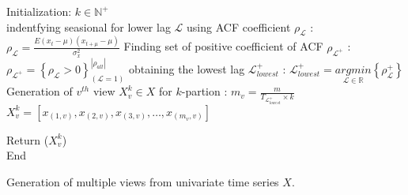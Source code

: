 \documentclass[a4paper, fleqn]{cas-sc}
\theoremstyle{definition}
\theoremstyle{remark}
\begin{document}
\newcommand\mycommfont[1]{\footnotesize\ttfamily\textcolor{blue}{#1}}

\begin{algorithm}[!ht]
  \DontPrintSemicolon
  
    
  Initialization:  $k \in \mathbb{N}^+$\\ 
  indentfying seasional for lower lag $\mathscr{L}$ using ACF coefficient $\rho_{\mathscr{L}}$ :  
  $\rho_{\mathscr{L}}=\frac{E (x_t-\mu) (x_{t+\mu} -\mu)}{\sigma_x^2}$ 
  Finding set of positive coefficient of ACF $\rho_{\mathscr{L}^+}$ :  
  $\rho_{\mathscr{L}^+}= \left\{\rho_{\mathscr{L}} > 0 \right\}_{(\mathscr{L}=1)}^{ \left| \rho_{all} \right|}$ 
  obtaining the lowest lag $\mathscr{L}_{lowest}^+$ :  
  $ \mathscr{L}_{lowest}^+ = \underset{\mathscr{L} \in \mathbb{R}}{arg min} \left\{\rho_{\mathscr{L}}^+  \right\}$ 
  Generation of $v^{th}$ view $X_v^k \in X$ for $k$-partion :  
  $m_v=\frac{m}{T_{ \mathscr{L}_{lowest}^+ }\times k}$ 
  $X_v^k = [x_{(1, v)}, x_{(2, v)}, x_{(3, v)},  \dots , x_{(m_v, v)}]$

  Return ($X_v^k$)\\
  End
  \caption{Generation of multiple views from univariate time series $X$.}\label{alg1}
  \end{algorithm}
  
\end{document}
